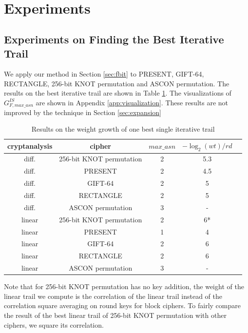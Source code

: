 \section{Experiments\label{sec:experiment}}

\subsection{Experiments on Finding the Best Iterative Trail}

We apply our method in Section \ref{sec:fbit} to PRESENT, GIFT-64, RECTANGLE, 256-bit KNOT permutation and ASCON permutation. The results on the best iterative trail are shown in Table \ref{tab:it}. The visualizations of $G^{IS}_{F,max\_asn}$ are shown in Appendix \ref{app:visualization}. These results are not improved by the technique in Section \ref{sec:expansion}

\begin{table}
	\caption{Results on the weight growth of one best single iterative trail}\label{tab:it}
	\centering
	\begin{tabular}{|c|c|c|c|c|}
		\hline
		cryptanalysis & cipher & $max\_asn$ & $-\log_2(wt)/rd$\\
		\hline
		diff. & 256-bit KNOT permutation & 2 & 5.3\\
		\hline
		diff. & PRESENT & 2 & 4.5\\
		\hline
		diff. & GIFT-64 & 2 & 5\\
		\hline
		diff. & RECTANGLE & 2 & 5\\
		\hline
		diff. & ASCON permutation & 3 & -\\
		\hline
		linear & 256-bit KNOT permutation & 2 & 6*\\
		\hline
		linear & PRESENT & 1 & 4\\
		\hline
		linear & GIFT-64 & 2 & 6\\
		\hline
		linear & RECTANGLE & 2 & 6\\
		\hline
		linear & ASCON permutation & 3 & -\\
		\hline
	\end{tabular}
\end{table}

Note that for 256-bit KNOT permutation has no key addition, the weight of the linear trail we compute is the correlation of the linear trail instead of the correlation square averaging on round keys for block ciphers. To fairly compare the result of the best linear trail of 256-bit KNOT permutation with other ciphers, we square its correlation.

